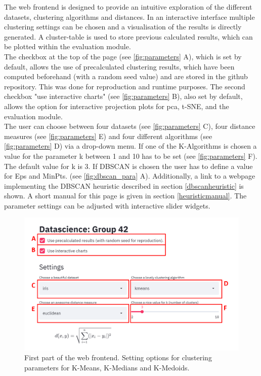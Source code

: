 The web frontend is designed to provide an intuitive exploration of the different datasets, clustering algorithms and distances. In an interactive interface multiple clustering settings can be chosen and a visualisation of the results is directly generated. 
A cluster-table is used to store previous calculated results, which can be plotted within the evaluation module. \\
The checkbox  at the top of the page (see \autoref{fig:parameters} A), which is set by default, allows the use of precalculated clustering results, which have been computed beforehand (with a random seed value) and are stored in the github repository. This was done for reproduction and runtime purposes. The second checkbox "use interactive charts" (see \autoref{fig:parameters} B), also set by default, allows the option for interactive projection plots for \acrshort{pca}, \acrshort{t-SNE}, and the evaluation module.  \\
The user can choose between four datasets (see \autoref{fig:parameters} C), four distance measures (see \autoref{fig:parameters} E) and four different algorithms (see \autoref{fig:parameters} D) via a drop-down menu. If one of the K-Algorithms is chosen a value for the parameter k between 1 and 10 has to be set (see \autoref{fig:parameters} F). The default value for k is 3. If DBSCAN is chosen the user has to define a value for Eps and MinPts. (see \autoref{fig:dbscan_para} A). Additionally, a link to a webpage implementing the DBSCAN heuristic described in section \ref{dbscanheuristic} is shown. A short manual for this page is given in section \ref{heuristicmanual}. The parameter settings can be adjusted with interactive slider widgets. \\
\begin{figure}[H]
	\centering
	\includegraphics[width=\linewidth]{modules/web_frontend/eingabe_letters}
	\caption{First part of the web frontend. Setting options for clustering parameters for K-Means, K-Medians and K-Medoids.}\label{fig:parameters}
\end{figure}
